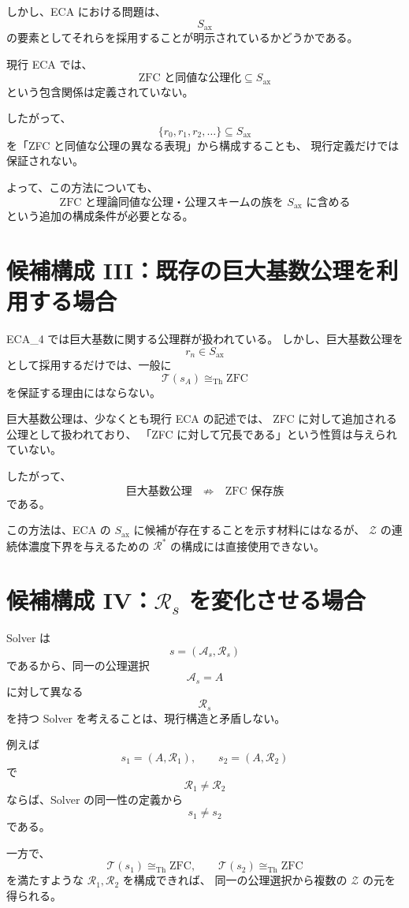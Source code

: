 \documentclass[a4paper,11pt]{jsarticle}
\newcommand{\Ax}{S_{\mathrm{ax}}}
\begin{document}
しかし、ECA における問題は、
\[
\Ax
\]
の要素としてそれらを採用することが明示されているかどうかである。

現行 ECA では、
\[
\text{ZFC と同値な公理化}
\subseteq
\Ax
\]
という包含関係は定義されていない。

したがって、
\[
\{r_0,r_1,r_2,\ldots\}\subseteq\Ax
\]
を「ZFC と同値な公理の異なる表現」から構成することも、
現行定義だけでは保証されない。

よって、この方法についても、
\[
\boxed{
\text{ZFC と理論同値な公理・公理スキームの族を $\Ax$ に含める}
}
\]
という追加の構成条件が必要となる。

\section{候補構成 III：既存の巨大基数公理を利用する場合}

ECA_4 では巨大基数に関する公理群が扱われている。
しかし、巨大基数公理を
\[
r_n\in\Ax
\]
として採用するだけでは、一般に
\[
\mathcal{T}(s_A)\cong_{\mathrm{Th}}\mathrm{ZFC}
\]
を保証する理由にはならない。

巨大基数公理は、少なくとも現行 ECA の記述では、
ZFC に対して追加される公理として扱われており、
「ZFC に対して冗長である」という性質は与えられていない。

したがって、
\[
\text{巨大基数公理}
\quad\not\Rightarrow\quad
\text{ZFC 保存族}
\]
である。

この方法は、ECA の $\Ax$ に候補が存在することを示す材料にはなるが、
$\mathcal{Z}$ の連続体濃度下界を与えるための
$\mathcal{R}^{*}$ の構成には直接使用できない。

\section{候補構成 IV：$\mathcal{R}_s$ を変化させる場合}

Solver は
\[
s=(\mathcal{A}_s,\mathcal{R}_s)
\]
であるから、同一の公理選択
\[
\mathcal{A}_s=A
\]
に対して異なる
\[
\mathcal{R}_s
\]
を持つ Solver を考えることは、現行構造と矛盾しない。

例えば
\[
s_1=(A,\mathcal{R}_1),
\qquad
s_2=(A,\mathcal{R}_2)
\]
で
\[
\mathcal{R}_1\neq\mathcal{R}_2
\]
ならば、Solver の同一性の定義から
\[
s_1\neq s_2
\]
である。

一方で、
\[
\mathcal{T}(s_1)\cong_{\mathrm{Th}}\mathrm{ZFC},
\qquad
\mathcal{T}(s_2)\cong_{\mathrm{Th}}\mathrm{ZFC}
\]
を満たすような $\mathcal{R}_1,\mathcal{R}_2$ を構成できれば、
同一の公理選択から複数の $\mathcal{Z}$ の元を得られる。
\end{document}
